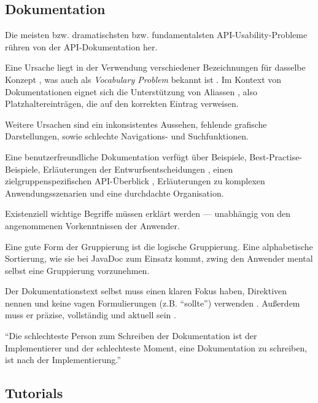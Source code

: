   
\subsection{Dokumentation}

  Die meisten \citep{Zibran:2011fx,Grill:2012jm} bzw. dramatischsten \citep{Robillard:2010bh} bzw. fundamentalsten \citep{Bloch:2006jk} API-Usability-Probleme rühren von der API-Dokumentation her.
  
  Eine Ursache liegt in der Verwendung verschiedener Bezeichnungen für dasselbe Konzept \citep{Aguiar:2000dn}, was auch als \textit{Vocabulary Problem} bekannt ist \citep{Good:1984kr,Furnas:1987hl}. Im Kontext von Dokumentationen eignet sich die Unterstützung von Aliassen \citep{Stylos:2009gc}, also Platzhaltereinträgen, die auf den korrekten Eintrag verweisen.
  
  Weitere Ursachen sind ein inkonsistentes Aussehen, fehlende grafische Darstellungen, sowie schlechte Navigations- und Suchfunktionen. \citep{Jeong:kf}
  
  Eine benutzerfreundliche Dokumentation verfügt über Beispiele, Best-Practise-Beispiele, Erläuterungen der Entwurfsentscheidungen \citep[ebenso ][]{Aguiar:2000dn}, einen zielgruppenspezifischen API-Überblick \citep[ebenso ][]{Fairbanks:2006jw,Ko:2011vw,Pugh:Ks4cicwp,Nykaza:2002im}, Erläuterungen zu komplexen Anwendungsszenarien und eine durchdachte Organisation. \citep{Robillard:2009cs}
  
  Existenziell wichtige Begriffe müssen erklärt werden --- unabhängig von den angenommenen Vorkenntnissen der Anwender. \citep{Jeong:kf,Nykaza:2002im}

  Eine gute Form der Gruppierung ist die logische Gruppierung. Eine alphabetische Sortierung, wie sie bei JavaDoc zum Einsatz kommt, zwing den Anwender mental selbst eine Gruppierung vorzunehmen. \citep{DaqingHou:2005ba}
  
  Der Dokumentationstext selbst muss einen klaren Fokus haben, Direktiven nennen und keine vagen Formulierungen (z.B. ``sollte'') verwenden \citep{Monperrus:2011bf}. Außerdem muss er präzise, vollständig und aktuell sein \citep{Piccioni:2013uq,Parnas:2011kr,Zibran:2011fx}.
  
  ``Die schlechteste Person zum Schreiben der Dokumentation ist der Implementierer und der schlechteste Moment, eine Dokumentation zu schreiben, ist nach der Implementierung.'' \citep{Henning:2007kg}
  
  
  
\subsection{Tutorials}
  
